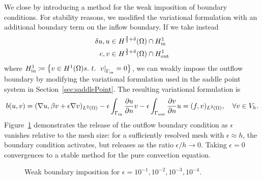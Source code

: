 \documentclass[final,leqno]{siamltex}
\newcommand{\LRp}[1]{\left( #1 \right)}
\newcommand{\LRc}[1]{\left\{ #1 \right\}}
\newcommand{\Grad} {\ensuremath{\nabla}}
\renewcommand{\L}{L^2\LRp{\Omega}}
\newcommand{\pd}[2]{\frac{\partial#1}{\partial#2}}
\begin{document}
We close by introducing a method for the weak imposition of boundary conditions.  For stability reasons, we modified the variational formulation with an additional boundary term on the inflow boundary.  If we take instead 
\begin{align*}
\delta u, u &\in H^{\frac{3}{2}+\delta}(\Omega) \cap H^1_{\rm in} \\
e,v &\in H^{\frac{3}{2}+\delta}(\Omega) \cap H^1_{\rm out}
\end{align*}
where $H^1_{\rm in} \coloneqq \LRc{v\in H^1(\Omega) s.\ t.\ \left.v\right|_{\Gamma_{\rm in}} = 0}$, we can weakly impose the outflow boundary by modifying the variational formulation used in the saddle point system in Section~\ref{sec:saddlePoint}.  The resulting variational formulation is 
\[
b(u,v) = (\Grad u, \beta v + \epsilon \Grad v)_{\L} - \epsilon\int_{\Gamma_{\rm in}} \pd{u}{n}v - \epsilon\int_{\Gamma_{\rm out}} \pd{v}{n} u = (f,v)_{\L}, \quad \forall v \in V_h.
\]
Figure~\ref{fig:weakBCs} demonstrates the release of the outflow boundary condition as ${\epsilon}$ vanishes relative to the mesh size: for a sufficiently resolved mesh with $\epsilon \approx h$, the boundary condition activates, but releases as the ratio $\epsilon/h \rightarrow 0$.  Taking $\epsilon = 0$ convergences to a stable method for the pure convection equation.  
\begin{figure}
\centering
{}
\caption{Weak boundary imposition for $\epsilon = 10^{-1}, 10^{-2}, 10^{-3}, 10^{-4}$.}
\label{fig:weakBCs}
\end{figure}	
\end{document}

